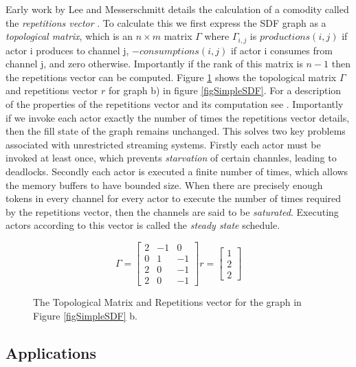 Early work by Lee and Messerschmitt details the calculation of a comodity called the {\em repetitions vector} \cite{lee87}.
To calculate this we first express the SDF graph as a {\em topological matrix}, which is an $n \times m$ matrix $\Gamma$ where $\Gamma_{i,j}$ is $productions(i, j)$ if actor i produces to channel j, $-consumptions(i, j)$ if actor i consumes from channel j, and zero otherwise.
Importantly if the rank of this matrix is $n-1$ then the repetitions vector can be computed.
Figure \ref{figSimpleTop} shows the topological matrix $\Gamma$ and repetitions vector $r$ for graph b) in figure \ref{figSimpleSDF}.
For a description of the properties of the repetitions vector and its computation see \cite{sdfBook}.
Importantly if we invoke each actor exactly the number of times the repetitions vector details, then the fill state of the graph remains unchanged.
This solves two key problems associated with unrestricted streaming systems.
Firstly each actor must be invoked at least once, which prevents {\em starvation} of certain channles, leading to deadlocks.
Secondly each actor is executed a finite number of times, which allows the memory buffers to have bounded size.
When there are precisely enough tokens in every channel for every actor to execute the number of times required by the repetitions vector, then the channels are said to be {\em saturated}.
Executing actors according to this vector is called the {\em steady state} schedule.

\begin{figure}
\begin{center}
\[
	\Gamma = \begin{bmatrix}
	2 & -1 & 0 \\
	0 & 1 & -1 \\
	2 & 0 & -1 \\
	2 & 0 & -1
	\end{bmatrix}
	r = \begin{bmatrix}
		1 \\
		2 \\
		2
	\end{bmatrix}
\]
\caption{The Topological Matrix and Repetitions vector for the graph in Figure \ref{figSimpleSDF} b.}
\label{figSimpleTop}
\end{center}
\end{figure}

\subsection{Applications}

